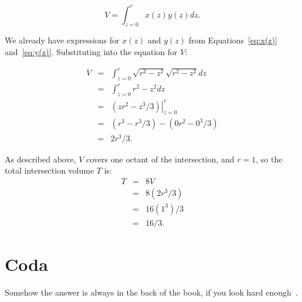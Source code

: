 \documentclass[twocolumn]{article}
\theoremstyle{definition}
\theoremstyle{plain}
\begin{document}
\begin{equation*}
  V = \int_{z=0}^r x(z) y(z) dz.
\end{equation*}

We already have expressions for $x(z)$ and $y(z)$ from
Equations~\ref{eq:x(z)} and~\ref{eq:y(z)}.  Substituting into the
equation for $V$:

\begin{eqnarray*}
  V & = & \int_{z=0}^r \sqrt{r^2 - z^2} \sqrt{r^2 - z^2} dz \\
  & = & \int_{z=0}^r r^2 - z^2 dz \\
  & = & \left. (zr^2 - z^3/3) \right|_{z=0}^r \\
  & = & (r^3 - r^3/3) - (0r^2 - 0^3/3) \\
  & = & 2r^3/3.
\end{eqnarray*}

As described above, $V$ covers one octant of the intersection, and
$r=1$, so the total intersection volume $T$ is:
\begin{eqnarray*}
  T & = & 8V \\
  & = & 8(2r^3/3) \\
  & = & 16(1^3)/3 \\
  & = & 16/3.
\end{eqnarray*}

\section{Coda}

Somehow the answer is always in the back of the book, if you look hard
enough~\cite{Wikipedia-Steinmetz}.



\end{document}
